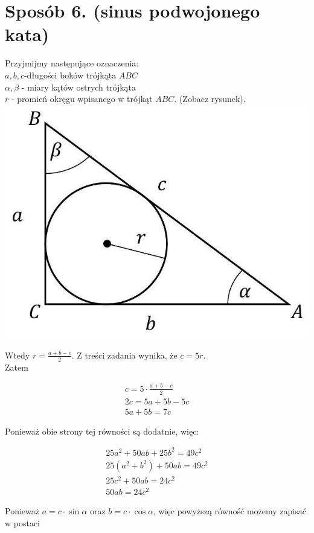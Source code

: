 \documentclass[10pt]{article}
\begin{document}
\section*{Sposób 6. (sinus podwojonego kata)}
Przyjmijmy następujące oznaczenia:\\
$a, b, c$-długości boków trójkąta $A B C$\\
$\alpha, \beta$ - miary kątów ostrych trójkąta\\
$r$ - promień okręgu wpisanego w trójkąt $A B C$. (Zobacz rysunek).\\
\includegraphics[max width=\textwidth, center]{2025_02_07_36131546116d12814c9cg-44}

Wtedy $r=\frac{a+b-c}{2}$. Z treści zadania wynika, że $c=5 r$.\\
Zatem

$$
\begin{gathered}
c=5 \cdot \frac{a+b-c}{2} \\
2 c=5 a+5 b-5 c \\
5 a+5 b=7 c
\end{gathered}
$$

Ponieważ obie strony tej równości są dodatnie, więc:

$$
\begin{gathered}
25 a^{2}+50 a b+25 b^{2}=49 c^{2} \\
25\left(a^{2}+b^{2}\right)+50 a b=49 c^{2} \\
25 c^{2}+50 a b=24 c^{2} \\
50 a b=24 c^{2}
\end{gathered}
$$

Ponieważ $a=c \cdot \sin \alpha$ oraz $b=c \cdot \cos \alpha$, więc powyższą równość możemy zapisać w postaci
\end{document}
